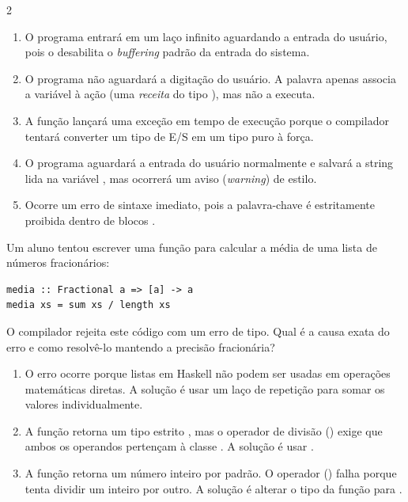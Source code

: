 \documentclass[a4paper,10pt,brazil]{article}
\begin{document}
\begin{multicols}{2}
\begin{enumerate}
  \item O programa entrará em um laço infinito aguardando a entrada do usuário, pois o  desabilita o \emph{buffering} padrão da entrada do sistema.

  \item O programa não aguardará a digitação do usuário. A palavra  apenas associa a variável  à ação (uma \emph{receita} do tipo ), mas não a executa.

  \item A função  lançará uma exceção em tempo de execução porque o compilador tentará converter um tipo de E/S em um tipo puro à força.

  \item O programa aguardará a entrada do usuário normalmente e salvará a string lida na variável , mas ocorrerá um aviso (\emph{warning}) de estilo.

  \item Ocorre um erro de sintaxe imediato, pois a palavra-chave  é estritamente proibida dentro de blocos .


\end{enumerate}

Um aluno tentou escrever uma função para calcular a média de uma lista de números fracionários:
\begin{verbatim}
media :: Fractional a => [a] -> a
media xs = sum xs / length xs
\end{verbatim}
O compilador rejeita este código com um erro de tipo. Qual é a causa exata do erro e como resolvê-lo mantendo a precisão fracionária?

\begin{enumerate}
  \item O erro ocorre porque listas em Haskell não podem ser usadas em operações matemáticas diretas. A solução é usar um laço de repetição  para somar os valores individualmente.

  \item A função  retorna um tipo estrito , mas o operador de divisão (\haskellinline{/}) exige que ambos os operandos pertençam à classe . A solução é usar .

  \item A função  retorna um número inteiro por padrão. O operador (\haskellinline{/}) falha porque tenta dividir um inteiro por outro. A solução é alterar o tipo da função para .


\end{enumerate}
\end{multicols}
\end{document}
